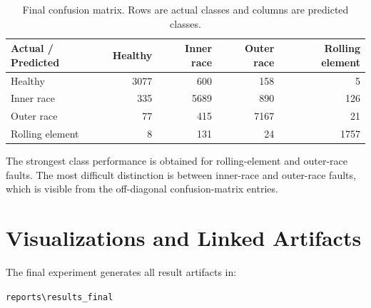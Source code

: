 \documentclass[11pt,a4paper]{article}
\begin{document}
\begin{table}[H]
\centering
\caption{Final confusion matrix. Rows are actual classes and columns are predicted classes.}
\label{tab:confusion}
\begin{tabular}{lrrrr}
\toprule
\textbf{Actual / Predicted} & \textbf{Healthy} & \textbf{Inner race} & \textbf{Outer race} & \textbf{Rolling element} \\
\midrule
Healthy & 3077 & 600 & 158 & 5 \\
Inner race & 335 & 5689 & 890 & 126 \\
Outer race & 77 & 415 & 7167 & 21 \\
Rolling element & 8 & 131 & 24 & 1757 \\
\bottomrule
\end{tabular}
\end{table}

The strongest class performance is obtained for rolling-element and outer-race faults. The most difficult distinction is between inner-race and outer-race faults, which is visible from the off-diagonal confusion-matrix entries.

\section{Visualizations and Linked Artifacts}
The final experiment generates all result artifacts in:
\begin{center}
\texttt{reports\textbackslash results\_final}
\end{center}
\end{document}
